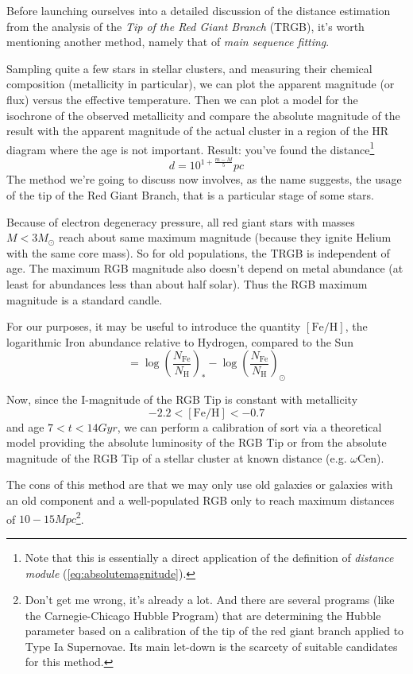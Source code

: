 Before launching ourselves into a detailed discussion of the distance estimation from the analysis of the \emph{Tip of the Red Giant Branch} (TRGB), it's worth mentioning another method, namely that of \emph{main sequence fitting}.
\par Sampling quite a few stars in stellar clusters, and measuring their chemical composition (metallicity in particular), we can plot the apparent magnitude (or flux) versus the effective temperature. Then we can plot a model for the isochrone of the observed metallicity and compare the absolute magnitude of the result with the apparent magnitude of the actual cluster in a region of the HR diagram where the age is not important. Result: you've found the distance\footnote{Note that this is essentially a direct application of the definition of \emph{distance module} (\ref{eq:absolutemagnitude}).}
\begin{equation}
    d = 10^{1+\frac{m-M}{5}}\unit{pc}
    \label{eq:mainsequencefitting}
\end{equation}
\vspace{5pt}
The method we're going to discuss now involves, as the name suggests, the usage of the tip of the Red Giant Branch, that is a particular stage of some stars.
\par Because of electron degeneracy pressure, all red giant stars with masses $M<3M_{\odot}$ reach about same maximum magnitude (because they ignite Helium with the same core mass). So for old populations, the TRGB is independent of age. The maximum RGB magnitude also doesn’t depend on metal abundance (at least for abundances less than about half solar). Thus the RGB maximum magnitude is a standard candle.
\par For our purposes, it may be useful to introduce the quantity $[\text{Fe}/\text{H}]$, the logarithmic Iron abundance relative to Hydrogen, compared to the Sun
\begin{equation}
    [\text{Fe}/\text{H}] = \log\left(\frac{N_{\text{Fe}}}{N_{\text{H}}}\right)_{*}-\log\left(\frac{N_{\text{Fe}}}{N_{\text{H}}}\right)_{\odot}
\end{equation}
\par Now, since the I-magnitude of the RGB Tip is constant with metallicity
\begin{equation*}
    -2.2 < [\text{Fe}/\text{H}] < -0.7
\end{equation*}
and age $7<t<14\unit{Gyr}$, we can perform a calibration of sort via a theoretical model providing the absolute luminosity of the RGB Tip or from the absolute magnitude of the RGB Tip of a stellar cluster at known distance (e.g. $\omega$Cen).
\par The cons of this method are that we may only use old galaxies or galaxies with an old component and a well-populated RGB only to reach maximum distances of $10-15\unit{Mpc}$\footnote{Don't get me wrong, it's already a lot. And there are several programs (like the Carnegie-Chicago Hubble Program) that are determining the Hubble parameter based on a calibration of the tip of the red giant branch applied to Type Ia Supernovae. Its main let-down is the scarcety of suitable candidates for this method.}.

